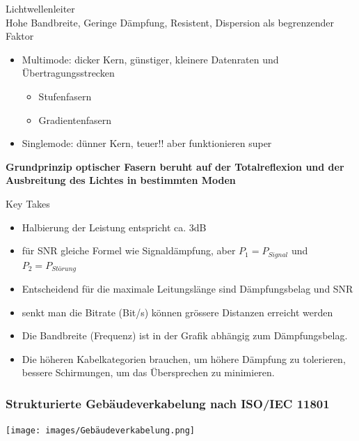     \begin{concept}{Lichtwellenleiter}\\
        Hohe Bandbreite, Geringe Dämpfung, Resistent, Dispersion als begrenzender Faktor

        \begin{itemize}
            \item Multimode: dicker Kern, günstiger, kleinere Datenraten und Übertragungsstrecken
            \begin{itemize}
                \item Stufenfasern
                \item Gradientenfasern
            \end{itemize}
            \item Singlemode: dünner Kern, teuer!! aber funktionieren super
        \end{itemize}
        \vspace{2mm}
        \textbf{Grundprinzip optischer Fasern beruht auf der Totalreflexion und der Ausbreitung des Lichtes in bestimmten Moden}
    \end{concept}

    \begin{KR}{Key Takes}
        \begin{itemize}
            \item Halbierung der Leistung entspricht ca. 3dB
            \item für SNR gleiche Formel wie Signaldämpfung, aber $P_1 = P_{Signal}$ und $P_2 = P_{Störung}$
            \item Entscheidend für die maximale Leitungslänge sind Dämpfungsbelag und SNR
            \item senkt man die Bitrate (Bit/s) können grössere Distanzen erreicht werden
            \item Die Bandbreite (Frequenz) ist in der Grafik abhängig zum Dämpfungsbelag.
            \item Die höheren Kabelkategorien brauchen, um höhere Dämpfung zu tolerieren, bessere Schirmungen, um das Übersprechen zu minimieren.
        \end{itemize}
    \end{KR}

    

    \subsubsection{Strukturierte Gebäudeverkabelung nach ISO/IEC 11801}
        \centering
        \texttt{[image: images/Gebäudeverkabelung.png]}
        
    
